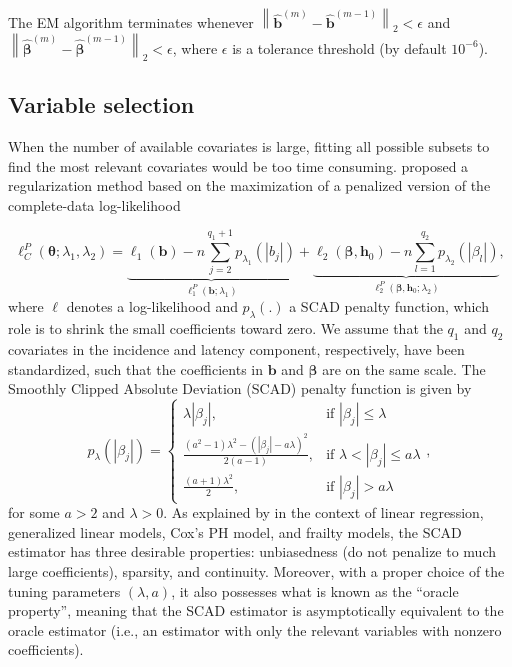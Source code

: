 The EM algorithm terminates whenever $\left\|\hat{\textbf{b}}^{(m)}-\hat{\textbf{b}}^{(m-1)}\right\|_2 < \epsilon$ and $\left\|\hat{\boldsymbol{\beta}}^{(m)}-\hat{\boldsymbol{\beta}}^{(m-1)}\right\|_2 < \epsilon$, where $\epsilon$ is a tolerance threshold (by default $10^{-6}$).



\subsection{Variable selection}

When the number of available covariates is large, fitting all possible subsets to find the most relevant covariates would be too time consuming.
\citet{Beretta_Heuchenne_2019} proposed a regularization method based on the maximization of a penalized version of the complete-data log-likelihood

$$\ell_C^P \left(\boldsymbol{\theta};\lambda_{1},\lambda_{2}\right) = \underbrace{\ell_1 \left(\textbf{b}\right) -n\sum_{j=2}^{q_1+1}p_{\lambda_{1}}\left(|b_{j}|\right)}_{\ell_1^P \left(\textbf{b};\lambda_{1}\right)} + \underbrace{\ell_2 \left(\boldsymbol{\beta},\textbf{h}_{0}\right) - n\sum_{l=1}^{q_2}p_{\lambda_{2}}\left(|\beta_{l}|\right)}_{\ell_2^P \left(\boldsymbol{\beta},\textbf{h}_{0};\lambda_{2}\right)},$$
where $\ell$ denotes a log-likelihood and $p_\lambda(.)$ a SCAD penalty function,
which role is to shrink the small coefficients toward zero. We assume that the $q_1$ and $q_2$ covariates in the incidence and latency component, respectively, have been standardized, such that the coefficients in $\mathbf{b}$ and $\boldsymbol{\beta}$ are on the same scale.
The Smoothly Clipped Absolute Deviation (SCAD) penalty function \citep{Fan_Li_2001} is given by
$$
p_{\lambda}(|\beta_{j}|)=\begin{cases}
\lambda|\beta_{j}|, & \textrm{if }|\beta_{j}|\leq\lambda\\
\frac{(a^{2}-1)\lambda^{2}-(|\beta_{j}|-a\lambda)^{2}}{2(a-1)}, & \textrm{if }\lambda<|\beta_{j}|\leq a\lambda\\
\frac{(a+1)\lambda^{2}}{2}, & \textrm{if }|\beta_{j}|>a\lambda
\end{cases},\label{eq:SCAD_penalty}
$$
for some $a>2$ and $\lambda>0$.  
As explained by \citet{Fan_Li_2001,Fan_Li_2002} in the context of linear regression, generalized linear models, Cox's PH model, and frailty models, the SCAD estimator has three desirable properties: unbiasedness (do not penalize to much large coefficients), sparsity, and continuity. 
Moreover, with a proper choice of the tuning parameters $(\lambda,a)$, it also possesses what is known as the ``oracle property'', meaning that the SCAD estimator is asymptotically equivalent to the oracle estimator (i.e., an estimator with only the relevant variables with nonzero coefficients). 

